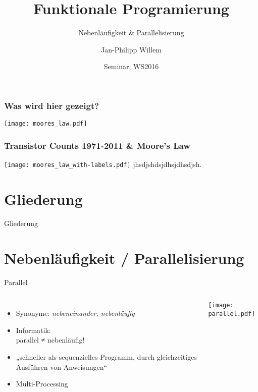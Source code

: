 \documentclass[compress]{beamer}
\title{Funktionale \break Programierung}
\subtitle{Nebenläufigkeit \& Parallelisierung}
\author{Jan-Philipp Willem}
\institute{
  Prof. Dr. Sandro Leuchter\\
  Fakultät für Informatik\\
  Hochschule Mannheim
}
\date{Seminar, WS2016}
\begin{document}
\begin{frame}
  \frametitle{Was wird hier gezeigt?}
  \texttt{[image: moores\_law.pdf]}
\end{frame}
 
\begin{frame}
  \frametitle{Transistor Counts 1971-2011 \& Moore's Law}
  \texttt{[image: moores\_law\_with-labels.pdf]}
  jhsdjshdsjdhsjdhsdjsh.
\end{frame}

\maketitle

\section*{Gliederung}
\begin{frame}{Gliederung}
  \tableofcontents[hideallsubsections]
\end{frame}

\section{Nebenläufigkeit / Parallelisierung}
  \begin{frame}{Parallel}
  \setcounter{framenumber}{1}
    \begin{columns}[c]
      \begin{itemize}
        \item Synonyme: \textit{nebeneinander, nebenläufig}
        \item Informatik:\\parallel ≠ nebenläufig!
        \item „schneller als sequenzielles Programm, durch gleichzeitiges Ausführen von \alert{Anweisungen}“
        \item Multi-Processing
      \end{itemize}
    \texttt{[image: parallel.pdf]}
    \end{columns}
  \end{frame}

\end{document}
